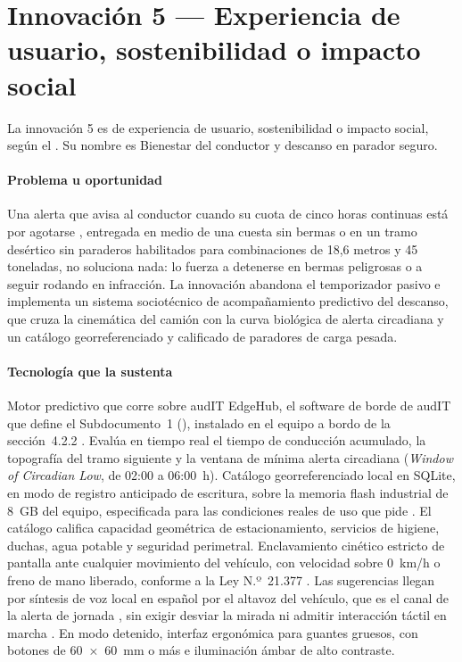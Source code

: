 \section{Innovación 5 — Experiencia de usuario, sostenibilidad o impacto social}\label{sec:13-innovacion-5}

La innovación 5 es de experiencia de usuario, sostenibilidad o impacto social, según el .
Su nombre es Bienestar del conductor y descanso en parador seguro.

\paragraph{Problema u oportunidad} Una alerta que avisa al conductor cuando su cuota de cinco horas
continuas está por agotarse \parencite{codigo_trabajo_25bis}, entregada en medio de una cuesta sin
bermas o en un tramo desértico sin paraderos habilitados para combinaciones de 18,6 metros y 45
toneladas, no soluciona nada: lo fuerza a detenerse en bermas peligrosas o a seguir rodando en
infracción. La innovación abandona el temporizador pasivo e implementa un sistema sociotécnico de
acompañamiento predictivo del descanso, que cruza la cinemática del camión con la curva biológica de
alerta circadiana y un catálogo georreferenciado y calificado de paradores de carga pesada.

\paragraph{Tecnología que la sustenta} Motor predictivo que corre sobre audIT EdgeHub, el software
de borde de audIT que define el Subdocumento~1 (), instalado en el equipo a bordo de la sección~4.2.2 . Evalúa en tiempo real el tiempo de conducción acumulado, la
topografía del tramo siguiente y la ventana de mínima alerta circadiana (\emph{Window of Circadian
Low}, de 02:00 a 06:00~h). Catálogo georreferenciado local en SQLite, en modo de registro anticipado de escritura, sobre la
memoria flash industrial de 8~GB del equipo, especificada para las condiciones reales de uso que pide
. El catálogo califica
capacidad geométrica de estacionamiento, servicios de higiene, duchas, agua potable y seguridad
perimetral. Enclavamiento cinético estricto de pantalla ante cualquier movimiento del vehículo, con
velocidad sobre 0~km/h o freno de mano liberado, conforme a la Ley N.º~21.377 \parencite{ley21377}.
Las sugerencias llegan por síntesis de voz local en español por el altavoz del vehículo, que es el
canal de la alerta de jornada , sin exigir desviar la mirada ni admitir
interacción táctil en marcha . En modo detenido, interfaz ergonómica para guantes gruesos, con botones
de 60~×~60~mm o más e iluminación ámbar de alto contraste.

